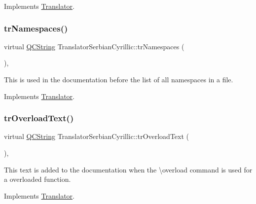 Implements \mbox{\hyperlink{class_translator}{Translator}}.

\mbox{\label{class_translator_serbian_cyrillic_ac403f97448f90c24fdd0368f356c58a8}} 
\subsubsection{\texorpdfstring{trNamespaces()}{trNamespaces()}}
{\footnotesize\ttfamily virtual \mbox{\hyperlink{class_q_c_string}{Q\+C\+String}} Translator\+Serbian\+Cyrillic\+::tr\+Namespaces (\begin{DoxyParamCaption}{ }\end{DoxyParamCaption})\hspace{0.3cm}{\ttfamily [inline]}, {\ttfamily [virtual]}}

This is used in the documentation before the list of all namespaces in a file. 

Implements \mbox{\hyperlink{class_translator}{Translator}}.

\mbox{\label{class_translator_serbian_cyrillic_a623839d48b9ac5d1ad1fc97d2a57fb6f}} 
\subsubsection{\texorpdfstring{trOverloadText()}{trOverloadText()}}
{\footnotesize\ttfamily virtual \mbox{\hyperlink{class_q_c_string}{Q\+C\+String}} Translator\+Serbian\+Cyrillic\+::tr\+Overload\+Text (\begin{DoxyParamCaption}{ }\end{DoxyParamCaption})\hspace{0.3cm}{\ttfamily [inline]}, {\ttfamily [virtual]}}

This text is added to the documentation when the \textbackslash{}overload command is used for a overloaded function. 

Implements \mbox{\hyperlink{class_translator}{Translator}}.

\mbox{\label{class_translator_serbian_cyrillic_ae0960b5ad5aef701e94ee70f73bf24da}} 
